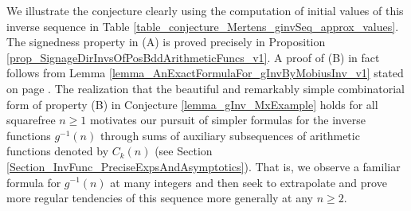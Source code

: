 \documentclass[11pt,reqno,a4letter]{article}
\numberwithin{figure}{section}
\numberwithin{table}{section}
\theoremstyle{plain}
\numberwithin{theorem}{section}
\theoremstyle{definition}
\begin{document}
We illustrate the conjecture clearly using the computation of initial values of 
this inverse sequence in 
Table \ref{table_conjecture_Mertens_ginvSeq_approx_values}. 
The signedness property in (A) is proved precisely in 
Proposition \ref{prop_SignageDirInvsOfPosBddArithmeticFuncs_v1}. 
A proof of (B) in fact follows from 
Lemma \ref{lemma_AnExactFormulaFor_gInvByMobiusInv_v1} 
stated on page \pageref{lemma_AnExactFormulaFor_gInvByMobiusInv_v1}. 
The realization that the beautiful and remarkably simple combinatorial form of property (B) 
in Conjecture \ref{lemma_gInv_MxExample} holds for all squarefree $n \geq 1$ 
motivates our pursuit of simpler formulas for the inverse functions $g^{-1}(n)$ 
through sums of auxiliary subsequences of arithmetic functions denoted by $C_k(n)$  
(see Section \ref{Section_InvFunc_PreciseExpsAndAsymptotics}). 
That is, we observe a familiar formula for $g^{-1}(n)$ at many integers and then seek 
to extrapolate and prove more regular tendencies of this sequence more generally at any $n \geq 2$. 
\end{document}
